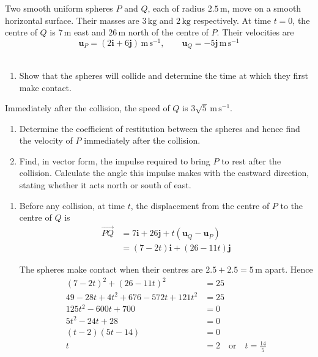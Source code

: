 \documentclass[leqno]{article}
\begin{document}
\begin{enumerate}[
  label=\textbf{\arabic*.},
  leftmargin=*,
  topsep=0pt,
  partopsep=0pt,
  parsep=0pt
]
Two smooth uniform spheres $P$ and $Q$, each of radius $2.5\,\mathrm{m}$, move on a smooth horizontal surface. Their masses are $3\,\mathrm{kg}$ and $2\,\mathrm{kg}$ respectively. At time $t=0$, the centre of $Q$ is $7\,\mathrm{m}$ east and $26\,\mathrm{m}$ north of the centre of $P$. Their velocities are
\[
\mathbf{u}_P=(2\mathbf{i}+6\mathbf{j})\,\mathrm{m\,s^{-1}},\qquad \mathbf{u}_Q=-5\mathbf{j}\,\mathrm{m\,s^{-1}}
\] \\
\begin{enumerate}[label=\textbf{(\alph*)}]
\item Show that the spheres will collide and determine the time at which they first make contact.  \\
\end{enumerate}
Immediately after the collision, the speed of $Q$ is $3\sqrt{5}\,\mathrm{m\,s^{-1}}$. \\
\begin{enumerate}[label=\textbf{(\alph*)}, resume]
\item Determine the coefficient of restitution between the spheres and hence find the velocity of $P$ immediately after the collision.  \\
\item Find, in vector form, the impulse required to bring $P$ to rest after the collision. Calculate the angle this impulse makes with the eastward direction, stating whether it acts north or south of east.  \\
\end{enumerate}

\vspace*{10pt}

\begin{djsSolution}
\begin{enumerate}[label=\textbf{(\alph*)}, start=1]
\item Before any collision, at time \(t\), the displacement from the centre of \(P\) to the centre of \(Q\) is
\begin{align*}
\overrightarrow{PQ}
&=7\mathbf{i}+26\mathbf{j}+t(\mathbf{u}_Q-\mathbf{u}_P)\\
&=(7-2t)\mathbf{i}+(26-11t)\mathbf{j}
\end{align*}

The spheres make contact when their centres are \(2.5+2.5=5\,\mathrm{m}\) apart. Hence
\begin{align*}
(7-2t)^2+(26-11t)^2&=25\\
49-28t+4t^2+676-572t+121t^2&=25\\
125t^2-600t+700&=0\\
5t^2-24t+28&=0\\
(t-2)(5t-14)&=0\\
t&=2\quad\text{or}\quad t=\frac{14}{5}
\end{align*}


\end{enumerate}
\end{djsSolution}
\end{enumerate}
\end{document}
